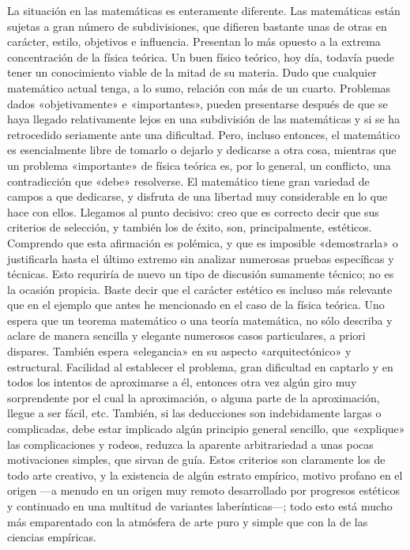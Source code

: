 \documentclass[a4paper, 12pt]{article}
\begin{document}
{La situación en las matemáticas es enteramente diferente. Las matemáticas están sujetas a gran número de subdivisiones, que difieren bastante unas de otras en carácter, estilo, objetivos e influencia. Presentan lo más opuesto a la extrema concentración de la física teórica. Un buen físico teórico, hoy día, todavía puede tener un conocimiento viable de la mitad de su materia. Dudo que cualquier matemático actual tenga, a lo sumo, relación con más de un cuarto. Problemas dados «objetivamente» e «importantes», pueden presentarse después de que se haya llegado relativamente lejos en una subdivisión de las matemáticas y si se ha retrocedido seriamente ante una dificultad. Pero, incluso entonces, el matemático es esencialmente libre de tomarlo o dejarlo y dedicarse a otra cosa, mientras que un problema «importante» de física teórica es, por lo general, un conflicto, una contradicción que «debe» resolverse. El matemático tiene gran variedad de campos a que dedicarse, y disfruta de una libertad muy considerable en lo que hace con ellos. Llegamos al punto decisivo: creo que es correcto decir que sus criterios de selección, y también los de éxito, son, principalmente, estéticos. Comprendo que esta afirmación es polémica, y que es imposible «demostrarla» o justificarla hasta el último
extremo sin analizar numerosas pruebas específicas y técnicas. Esto requriría de nuevo un tipo de discusión sumamente técnico; no es la ocasión propicia. Baste  decir que el carácter estético es incluso más relevante que en el ejemplo que antes
he mencionado en el caso de la física teórica. Uno espera que un teorema matemático o una teoría matemática, no sólo describa y aclare de manera sencilla y elegante numerosos casos particulares, a priori dispares. También espera «elegancia» en su aspecto «arquitectónico» y estructural. Facilidad al establecer el problema, gran dificultad en captarlo y en todos los intentos de aproximarse a él, entonces otra vez algún giro muy sorprendente por el cual la aproximación, o alguna parte de la aproximación, llegue a ser fácil, etc. También, si las deducciones son indebidamente largas o complicadas, debe estar implicado algún principio general sencillo, que «explique» las complicaciones y rodeos, reduzca la aparente arbitrariedad  a unas pocas motivaciones simples, que sirvan de guía. Estos criterios son claramente los de todo arte creativo, y la existencia de algún estrato empírico, motivo profano en el origen ---a menudo en un origen muy remoto desarrollado por progresos estéticos y continuado en una multitud de variantes laberínticas---; todo esto está mucho más emparentado con la atmósfera de arte puro y simple que con la de las ciencias empíricas.

}
\end{document}
